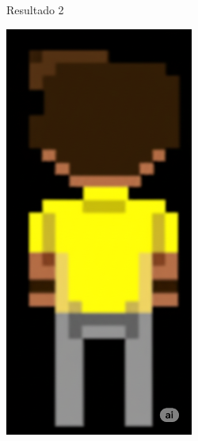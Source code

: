 \begin{figure}[htbp]
\begin{subfigure}{0.3\linewidth}
        \caption{\small Resultado 2}
        \label{fig:geminiProBack2b}
    \end{subfigure}
    \begin{subfigure}{0.3\linewidth}
        \includegraphics[width=1\linewidth]{figs/geminiPro/chat12/02_res3.png}

\end{subfigure}
\end{figure}

